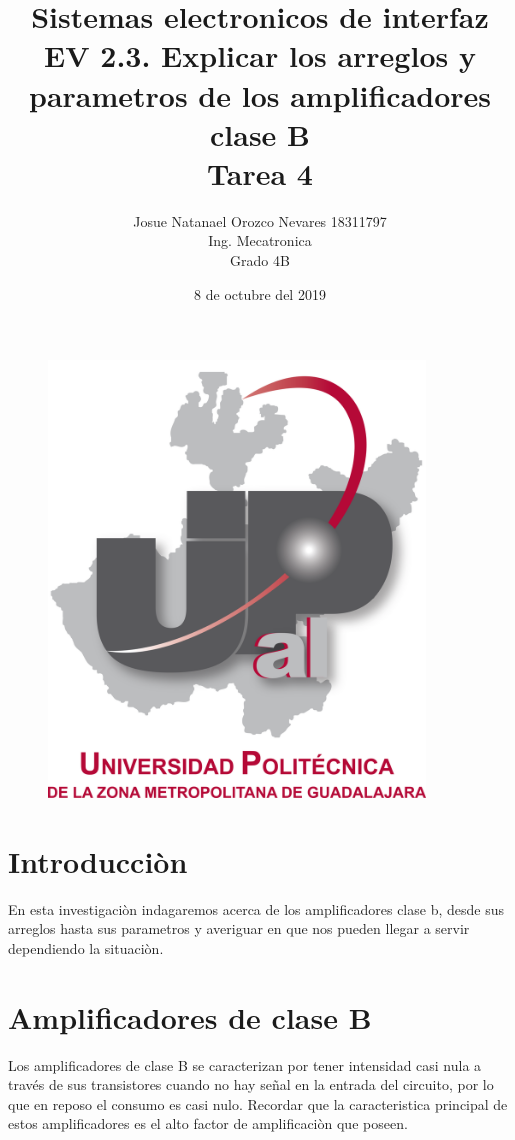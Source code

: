 \documentclass[12pt,a4paper]{article}
\begin{document}
\title{\textbf{Sistemas electronicos de interfaz\\EV 2.3. Explicar los arreglos y parametros de los amplificadores clase B\\Tarea 4}}
\author{Josue Natanael Orozco Nevares 18311797\\Ing. Mecatronica\\Grado 4B}
\date{8 de octubre del 2019}
\maketitle
\begin{figure}[h!]
\centering
\includegraphics[width=10cm]{UPCDLZMDG5783-logo.png} 
\end{figure}
\newpage

\section{Introducciòn}
En esta investigaciòn indagaremos acerca de los amplificadores clase b, desde sus arreglos hasta sus parametros y averiguar en que nos pueden llegar a servir dependiendo la situaciòn.

\section{Amplificadores de clase B}
Los amplificadores de clase B se caracterizan por tener intensidad casi nula a través de sus transistores cuando no hay señal en la entrada del circuito, por lo que en reposo el consumo es casi nulo. Recordar que la caracteristica principal de estos amplificadores es el alto factor de amplificaciòn que poseen.
\end{document}

